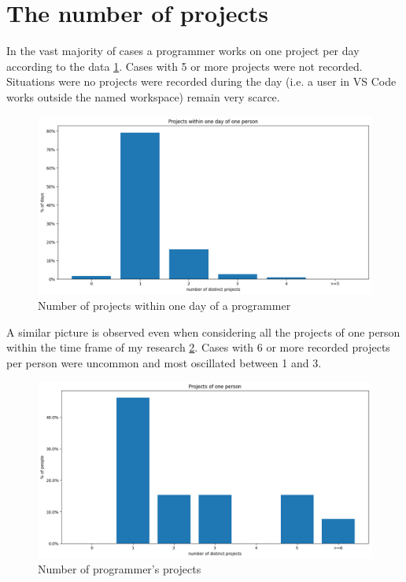 \section{The number of projects}

In the vast majority of cases a programmer works on one project per day according to the data \ref{fig:projects_per_day}. Cases with 5 or more projects were not recorded. Situations were no projects were recorded during the day (i.e. a user in VS Code works outside the named workspace) remain very scarce.

\begin{figure}[htbp]
  \centering
  \includegraphics[scale=0.5]{chapters/results/graphics/projects-day.png}
  \caption{Number of projects within one day of a programmer}
  \label{fig:projects_per_day}
\end{figure}

A similar picture is observed even when considering all the projects of one person within the time frame of my research \ref{fig:projects_per_person}. Cases with 6 or more recorded projects per person were uncommon and most oscillated between 1 and 3.

\begin{figure}[htbp]
  \centering
  \includegraphics[scale=0.5]{chapters/results/graphics/projects-one-person.png}
  \caption{Number of programmer's projects}
  \label{fig:projects_per_person}
\end{figure}

